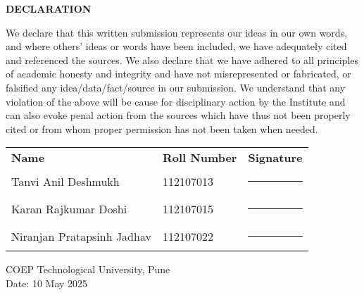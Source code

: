 \thispagestyle{empty}

\cleardoublepage 
\vspace*{1cm}  
{}
\begin{center}
 \Large {\bf \uppercase{Declaration}}
\end{center}

\vspace{2\baselineskip}
\begin{justify}
\noindent
We declare that this written submission represents our ideas in our own words, and where others' ideas or words have been included, we have adequately cited and referenced the sources. We also declare that we have adhered to all principles of academic honesty and integrity and have not misrepresented or fabricated, or falsified any idea/data/fact/source in our submission. We understand that any violation of the above will be cause for disciplinary action by the Institute and can also evoke penal action from the sources which have thus not been properly cited or from whom proper permission has not been taken when needed.
\end{justify}

\vspace{1.5\baselineskip}

\begin{center}
\begin{tabular}{lll}
\textbf{Name} & \textbf{Roll Number} & \textbf{Signature} \\[1em]
Tanvi Anil Deshmukh & 112107013 & \rule{4cm}{0.4pt} \\[1em]
Karan Rajkumar Doshi & 112107015 & \rule{4cm}{0.4pt} \\[1em]
Niranjan Pratapsinh Jadhav & 112107022 & \rule{4cm}{0.4pt} \\
\end{tabular}
\end{center}


\vspace{4\baselineskip}
\noindent
COEP Technological University, Pune \\
Date: 10 May 2025

